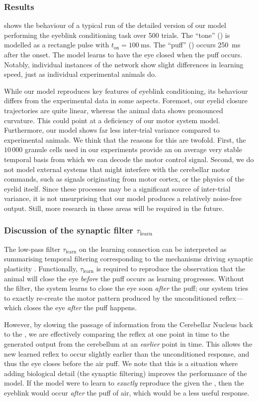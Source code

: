\subsubsection{Results}
 shows the behaviour of a typical run of the detailed version of our model performing the eyeblink conditioning task over 500 trials.
The \enquote{tone} (\CS) is modelled as a rectangle pulse with $t_\mathrm{on} = \SI{100}{\milli\second}$.
The \enquote{puff} (\US) occurs \SI{250}{\milli\second} after the \CS onset.
The model learns to have the eye closed when the puff occurs. Notably, individual instances of the network show slight differences in learning speed, just as individual experimental animals do.

While our model reproduces key features of eyeblink conditioning, its behaviour differs from the experimental data in some aspects.
Foremost, our eyelid closure trajectories are quite linear, whereas the animal data shows pronounced curvature.
This could point at a deficiency of our motor system model.
Furthermore, our model shows far less inter-trial variance compared to experimental animals.
We think that the reasons for this are twofold.
First, the $10\,000$ granule cells used in our experiments provide an on average very stable temporal basis from which we can decode the motor control signal.
Second, we do not model external systems that might interfere with the cerebellar motor commands, such as signals originating from motor cortex, or the physics of the eyelid itself.
Since these processes may be a significant source of inter-trial variance, it is not unsurprising that our model produces a relatively noise-free output.
Still, more research in these areas will be required in the future.


\subsubsection{Discussion of the synaptic filter $\tau_\mathrm{learn}$}
The low-pass filter $\tau_\mathrm{learn}$ on the learning connection can be interpreted as summarising temporal filtering corresponding to the mechanisms driving synaptic plasticity \citep[e.g.,][Chapter~66]{kandel2012principles}.
Functionally, $\tau_\mathrm{learn}$ is required to reproduce the observation that the animal will close the eye \emph{before} the puff occurs as learning progresses.
Without the filter, the system learns to close the eye soon \emph{after} the puff; our system tries to exactly re-create the motor pattern produced by the unconditioned reflex---which closes the eye \emph{after} the puff happens.

However, by slowing the passage of information from the Cerebellar Nucleus back to the \IO, we are effectively comparing the reflex at one point in time to the generated output from the cerebellum at an \emph{earlier} point in time.
This allows the new learned reflex to occur slightly earlier than the unconditioned response, and thus the eye closes before the air puff.
We note that this is a situation where adding biological detail (the synaptic filtering) improves the performance of the model.
If the model were to learn to \textit{exactly} reproduce the \UR given the \CS, then the eyeblink would occur \textit{after} the puff of air, which would be a less useful response.

